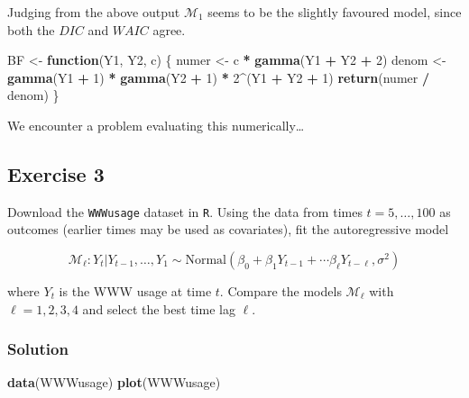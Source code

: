 \documentclass[
]{article}
\newenvironment{Shaded}{\begin{snugshade}}{\end{snugshade}}
\newcommand{\ControlFlowTok}[1]{\textcolor[rgb]{0.13,0.29,0.53}{\textbf{#1}}}
\newcommand{\DecValTok}[1]{\textcolor[rgb]{0.00,0.00,0.81}{#1}}
\newcommand{\FunctionTok}[1]{\textcolor[rgb]{0.13,0.29,0.53}{\textbf{#1}}}
\newcommand{\NormalTok}[1]{#1}
\newcommand{\OtherTok}[1]{\textcolor[rgb]{0.56,0.35,0.01}{#1}}
\newcommand{\SpecialCharTok}[1]{\textcolor[rgb]{0.81,0.36,0.00}{\textbf{#1}}}
\begin{document}
Judging from the above output \(\mathcal{M}_1\) seems to be the slightly
favoured model, since both the \(\textit{DIC}\) and \(\textit{WAIC}\)
agree.

\begin{Shaded}
\begin{Highlighting}[]
\NormalTok{BF }\OtherTok{\textless{}{-}} \ControlFlowTok{function}\NormalTok{(Y1, Y2, c) \{}
\NormalTok{  numer }\OtherTok{\textless{}{-}}\NormalTok{ c }\SpecialCharTok{*} \FunctionTok{gamma}\NormalTok{(Y1 }\SpecialCharTok{+}\NormalTok{ Y2 }\SpecialCharTok{+} \DecValTok{2}\NormalTok{)}
\NormalTok{  denom }\OtherTok{\textless{}{-}} \FunctionTok{gamma}\NormalTok{(Y1 }\SpecialCharTok{+} \DecValTok{1}\NormalTok{) }\SpecialCharTok{*} \FunctionTok{gamma}\NormalTok{(Y2 }\SpecialCharTok{+} \DecValTok{1}\NormalTok{) }\SpecialCharTok{*} \DecValTok{2}\SpecialCharTok{\^{}}\NormalTok{(Y1 }\SpecialCharTok{+}\NormalTok{ Y2 }\SpecialCharTok{+} \DecValTok{1}\NormalTok{)}
  \FunctionTok{return}\NormalTok{(numer }\SpecialCharTok{/}\NormalTok{ denom)}
\NormalTok{\}}
\end{Highlighting}
\end{Shaded}

We encounter a problem evaluating this numerically\ldots{}

\subsection{Exercise 3}\label{exercise-3}

Download the \texttt{WWWusage} dataset in \texttt{R}. Using the data
from times \(t = 5, \ldots, 100\) as outcomes (earlier times may be used
as covariates), fit the autoregressive model

\[
\mathcal M_\ell: Y_t | Y_{t - 1}, \ldots, Y_1 \sim \text{Normal}(\beta_0 + \beta_1 Y_{t - 1} + \cdots \beta_\ell Y_{t - \ell}, \sigma^2)
\]

where \(Y_t\) is the WWW usage at time \(t\). Compare the models
\(\mathcal M_\ell\) with \(\ell = 1, 2, 3, 4\) and select the best time
lag \(\ell\).

\subsubsection{Solution}\label{solution-2}

\begin{Shaded}
\begin{Highlighting}[]
\FunctionTok{data}\NormalTok{(WWWusage)}
\FunctionTok{plot}\NormalTok{(WWWusage)}
\end{Highlighting}
\end{Shaded}
\end{document}
